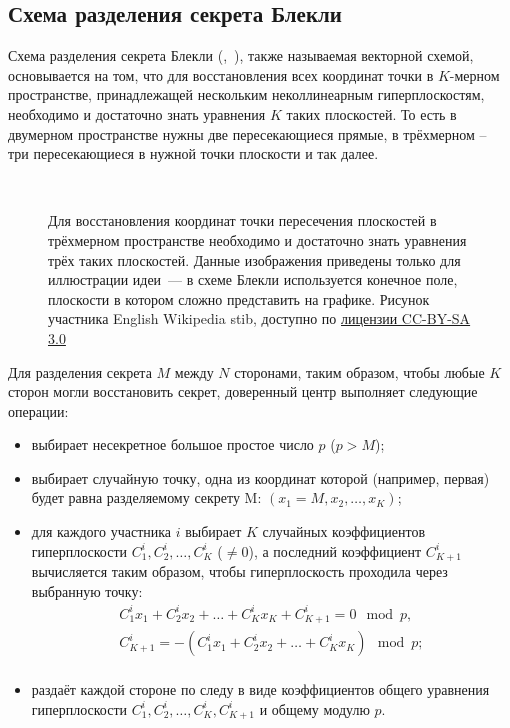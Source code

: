 \subsection[Схема Блекли]{Схема разделения секрета Блекли}

Схема разделения секрета Блекли (,~\cite{Blackley:1979}), также называемая векторной схемой, основывается на том, что для восстановления всех координат точки в $K$-мерном пространстве, принадлежащей нескольким неколлинеарным гиперплоскостям, необходимо и достаточно знать уравнения $K$ таких плоскостей. То есть в двумерном пространстве нужны две пересекающиеся прямые, в трёхмерном -- три пересекающиеся в нужной точки плоскости и так далее.

\begin{figure}[thb]
	\centering
	~~~~
	\caption{Для восстановления координат точки пересечения плоскостей в трёхмерном пространстве необходимо и достаточно знать уравнения трёх таких плоскостей. Данные изображения приведены только для иллюстрации идеи~--- в схеме Блекли используется конечное поле, плоскости в котором сложно представить на графике. Рисунок участника English Wikipedia stib, доступно по \href{https://creativecommons.org/licenses/by-sa/3.0/deed.ru}{лицензии CC-BY-SA 3.0}}
\end{figure}

Для разделения секрета $M$ между $N$ сторонами, таким образом, чтобы любые $K$ сторон могли восстановить секрет, доверенный центр выполняет следующие операции:
\begin{itemize}
	\item выбирает несекретное большое простое число $p$ ($p > M$);
	\item выбирает случайную точку, одна из координат которой (например, первая) будет равна разделяемому секрету M: $(x_1 = M, x_2, \dots, x_K)$;
	\item для каждого участника $i$ выбирает $K$ случайных коэффициентов гиперплоскости $C^i_1, C^i_2, \dots, C^i_{K}$ ($\ne 0$), а последний коэффициент $C^i_{K+1}$ вычисляется таким образом, чтобы гиперплоскость проходила через выбранную точку:
		\[ \begin{array}{l}
			C^i_1 x_1 + C^i_2 x_2 + \dots + C^i_K x_K + C^i_{K+1} = 0 \mod p, \\
			C^i_{K+1} = - ( C^i_1 x_1 + C^i_2 x_2 + \dots + C^i_K x_K ) \mod p; \\
		\end{array} \]
	\item раздаёт каждой стороне по следу в виде коэффициентов общего уравнения гиперплоскости $C^i_1, C^i_2, \dots, C^i_{K}, C^i_{K+1}$ и общему модулю $p$.
\end{itemize}

